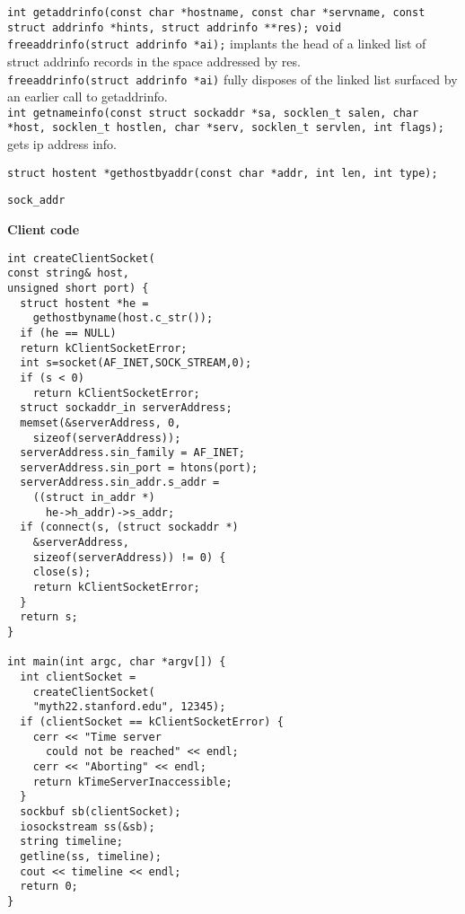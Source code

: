 \documentclass{article}
\begin{document}
\begin{multicols}{2}
  {\tt int getaddrinfo(const char *hostname, const char *servname,
  const struct addrinfo *hints, struct addrinfo **res);
  void freeaddrinfo(struct addrinfo *ai);} implants the head of a
  linked list of struct addrinfo records in the space addressed by
  res.\\
  {\tt freeaddrinfo(struct addrinfo *ai)} fully disposes of the linked list
  surfaced by an earlier call to getaddrinfo.\\
  {\tt int getnameinfo(const struct sockaddr *sa, socklen\_t salen,
  char *host, socklen\_t hostlen,
  char *serv, socklen\_t servlen, int flags);} gets ip address info.

  {\tt struct hostent *gethostbyaddr(const char *addr, int len, int type);}

  {\tt sock\_addr}

  {\bf Client code}
  \begin{verbatim}
int createClientSocket(
const string& host,
unsigned short port) {
  struct hostent *he =
    gethostbyname(host.c_str());
  if (he == NULL)
  return kClientSocketError;
  int s=socket(AF_INET,SOCK_STREAM,0);
  if (s < 0)
    return kClientSocketError;
  struct sockaddr_in serverAddress;
  memset(&serverAddress, 0,
    sizeof(serverAddress));
  serverAddress.sin_family = AF_INET;
  serverAddress.sin_port = htons(port);
  serverAddress.sin_addr.s_addr =
    ((struct in_addr *)
      he->h_addr)->s_addr;
  if (connect(s, (struct sockaddr *)
    &serverAddress,
    sizeof(serverAddress)) != 0) {
    close(s);
    return kClientSocketError;
  }
  return s;
}

int main(int argc, char *argv[]) {
  int clientSocket =
    createClientSocket(
    "myth22.stanford.edu", 12345);
  if (clientSocket == kClientSocketError) {
    cerr << "Time server
      could not be reached" << endl;
    cerr << "Aborting" << endl;
    return kTimeServerInaccessible;
  }
  sockbuf sb(clientSocket);
  iosockstream ss(&sb);
  string timeline;
  getline(ss, timeline);
  cout << timeline << endl;
  return 0;
}
  \end{verbatim}


\end{multicols}
\end{document}
